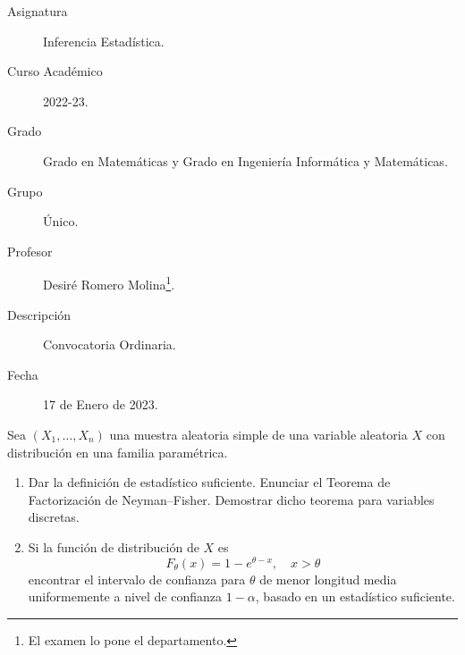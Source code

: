 \documentclass[12pt]{article}
\begin{document}

    
    

    \begin{description}
        \item[Asignatura] Inferencia Estadística.
        \item[Curso Académico] 2022-23.
        \item[Grado] Grado en Matemáticas y Grado en Ingeniería Informática y Matemáticas.
        \item[Grupo] Único.
        \item[Profesor] Desiré Romero Molina\footnote{El examen lo pone el departamento.}.
        \item[Descripción] Convocatoria Ordinaria.
        \item[Fecha] 17 de Enero de 2023.  
    \end{description}
    \newpage



    \begin{ejercicio}[2,25 puntos]
        Sea $(X_1,\ldots,X_n)$ una muestra aleatoria simple de una variable aleatoria $X$ con
        distribución en una familia paramétrica.

        \begin{enumerate}
            \item[a)] Dar la definición de estadístico suficiente. Enunciar el Teorema de
            Factorización de Neyman--Fisher. Demostrar dicho teorema para variables discretas.

            \item[b)] Si la función de distribución de $X$ es $$F_\theta(x)=1-e^{\theta - x}, \quad x>\theta$$
            encontrar el intervalo de confianza para $\theta$ de menor longitud media
            uniformemente a nivel de confianza $1-\alpha$, basado en un estadístico suficiente.
        \end{enumerate}
    \end{ejercicio}
\end{document}
